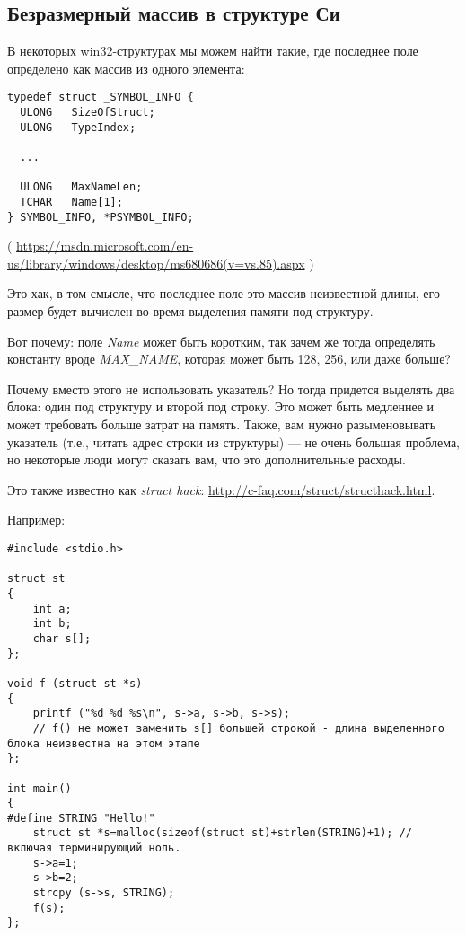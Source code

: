 \subsection{Безразмерный массив в структуре Си}

В некоторых win32-структурах мы можем найти такие, где последнее поле определено как массив из одного элемента:

\begin{lstlisting}[style=customc]
typedef struct _SYMBOL_INFO {
  ULONG   SizeOfStruct;
  ULONG   TypeIndex;
  
  ...

  ULONG   MaxNameLen;
  TCHAR   Name[1];
} SYMBOL_INFO, *PSYMBOL_INFO;
\end{lstlisting}

( \url{https://msdn.microsoft.com/en-us/library/windows/desktop/ms680686(v=vs.85).aspx} )

Это хак, в том смысле, что последнее поле это массив неизвестной длины, его размер будет вычислен во время выделения
памяти под структуру.

Вот почему: поле \emph{Name} может быть коротким, так зачем же тогда определять константу вроде \emph{MAX\_NAME},
которая может быть 128, 256, или даже больше?

Почему вместо этого не использовать указатель? Но тогда придется выделять два блока: один под структуру и второй
под строку.
Это может быть медленнее и может требовать больше затрат на память.
Также, вам нужно разыменовывать указатель (т.е., читать адрес строки из структуры) --- не очень большая проблема,
но некоторые люди могут сказать вам, что это дополнительные расходы.

Это также известно как \emph{struct hack}: \url{http://c-faq.com/struct/structhack.html}.

Например:

\begin{lstlisting}[style=customc]
#include <stdio.h>

struct st
{
	int a;
	int b;
	char s[];
};

void f (struct st *s)
{
	printf ("%d %d %s\n", s->a, s->b, s->s);
	// f() не может заменить s[] большей строкой - длина выделенного блока неизвестна на этом этапе
};

int main()
{
#define STRING "Hello!"
	struct st *s=malloc(sizeof(struct st)+strlen(STRING)+1); // включая терминирующий ноль.
	s->a=1;
	s->b=2;
	strcpy (s->s, STRING);
	f(s);
};
\end{lstlisting}

